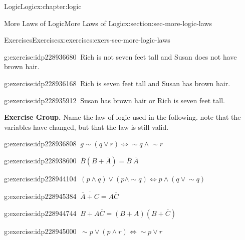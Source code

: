 \documentclass[twoside,10pt,]{book}
\numberwithin{equation}{section}
\begin{document}
\begin{chapterptx}{Logic}{}{Logic}{}{}{x:chapter:logic}
\begin{sectionptx}{More Laws of Logic}{}{More Laws of Logic}{}{}{x:section:sec-more-logic-laws}
\begin{exercises-subsection}{Exercises}{}{Exercises}{}{}{x:exercises:exers-sec-more-logic-laws}
\begin{exercisegroup}
\begin{divisionexerciseeg}{6}{}{}{g:exercise:idp228936680}%
\(\ \)Rich is not seven feet tall and Susan does not have brown hair.\end{divisionexerciseeg}%
\begin{divisionexerciseeg}{7}{}{}{g:exercise:idp228936168}%
\(\ \)Rich is seven feet tall and Susan has brown hair.\end{divisionexerciseeg}%
\begin{divisionexerciseeg}{8}{}{}{g:exercise:idp228935912}%
\(\ \)Susan has brown hair or Rich is seven feet tall.\end{divisionexerciseeg}%
\end{exercisegroup}
\par\medskip\noindent
\par\medskip\noindent%
\textbf{Exercise Group.}\space\space%
Name the law of logic used in the following.  note that the variables have changed, but that the law is still valid.\begin{exercisegroup}
\begin{divisionexerciseeg}{9}{}{}{g:exercise:idp228936808}%
\(\ g\sim\!{(q {\vee}{} r)} {\Leftrightarrow} \sim\!{q}{} {\wedge}{} \sim\!{r}{}\)\end{divisionexerciseeg}%
\begin{divisionexerciseeg}{10}{}{}{g:exercise:idp228938600}%
\(\ \overline{B}{} (B + \overline{A}{}) = \overline{B}{}~\overline{A}{} \)\end{divisionexerciseeg}%
\begin{divisionexerciseeg}{11}{}{}{g:exercise:idp228944104}%
\(\ (p {\wedge}{} q) {\vee}{} (p {\wedge} \sim\!{q}{}) {\Leftrightarrow}{} p {\wedge}{} (q {\vee}{}\sim\!{q}{})\)\end{divisionexerciseeg}%
\begin{divisionexerciseeg}{12}{}{}{g:exercise:idp228945384}%
\(\ \overline{\overline{A}{} + C} = A\overline{C}{}\)\end{divisionexerciseeg}%
\begin{divisionexerciseeg}{13}{}{}{g:exercise:idp228944744}%
\(\ B + A\overline{C}{} =(B+A)(B+\overline{C}{})\)\end{divisionexerciseeg}%
\begin{divisionexerciseeg}{14}{}{}{g:exercise:idp228945000}%
\(\ \sim\!{p}{} {\vee}{} (p {\wedge}{} r) {\Leftrightarrow}{} \sim\!{p}{}{\vee}{}r\)\end{divisionexerciseeg}%
\end{exercisegroup}
\par\medskip\noindent

\end{exercises-subsection}
\end{sectionptx}
\end{chapterptx}
\end{document}
